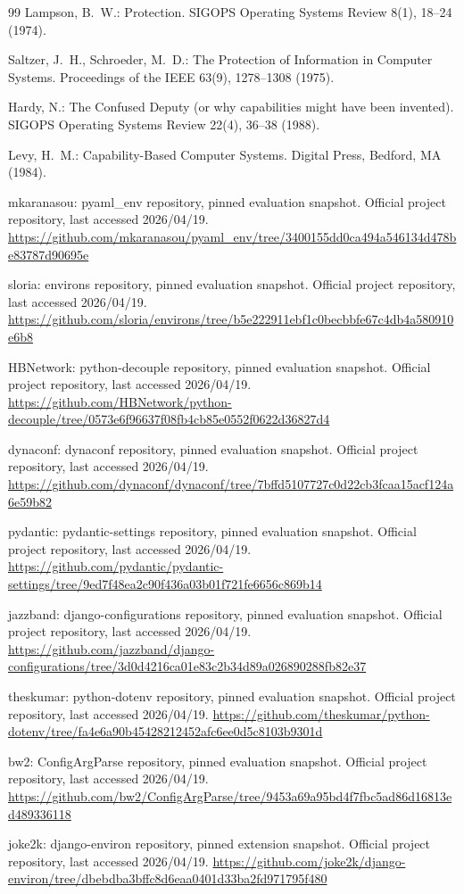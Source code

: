 \documentclass[runningheads]{llncs}
\begin{document}
\begin{thebibliography}{99}
Lampson, B.~W.: Protection. SIGOPS Operating Systems Review 8(1), 18--24 (1974).

Saltzer, J.~H., Schroeder, M.~D.: The Protection of Information in Computer Systems. Proceedings of the IEEE 63(9), 1278--1308 (1975).

Hardy, N.: The Confused Deputy (or why capabilities might have been invented). SIGOPS Operating Systems Review 22(4), 36--38 (1988).

Levy, H.~M.: Capability-Based Computer Systems. Digital Press, Bedford, MA (1984).

mkaranasou: pyaml\_env repository, pinned evaluation snapshot. Official project repository, last accessed 2026/04/19. \url{https://github.com/mkaranasou/pyaml_env/tree/3400155dd0ca494a546134d478be83787d90695e}

sloria: environs repository, pinned evaluation snapshot. Official project repository, last accessed 2026/04/19. \url{https://github.com/sloria/environs/tree/b5e222911ebf1c0becbbfe67c4db4a580910e6b8}

HBNetwork: python-decouple repository, pinned evaluation snapshot. Official project repository, last accessed 2026/04/19. \url{https://github.com/HBNetwork/python-decouple/tree/0573e6f96637f08fb4cb85e0552f0622d36827d4}

dynaconf: dynaconf repository, pinned evaluation snapshot. Official project repository, last accessed 2026/04/19. \url{https://github.com/dynaconf/dynaconf/tree/7bffd5107727c0d22cb3fcaa15acf124a6e59b82}

pydantic: pydantic-settings repository, pinned evaluation snapshot. Official project repository, last accessed 2026/04/19. \url{https://github.com/pydantic/pydantic-settings/tree/9ed7f48ea2c90f436a03b01f721fe6656c869b14}

jazzband: django-configurations repository, pinned evaluation snapshot. Official project repository, last accessed 2026/04/19. \url{https://github.com/jazzband/django-configurations/tree/3d0d4216ca01e83c2b34d89a026890288fb82e37}

theskumar: python-dotenv repository, pinned evaluation snapshot. Official project repository, last accessed 2026/04/19. \url{https://github.com/theskumar/python-dotenv/tree/fa4e6a90b45428212452afc6ee0d5c8103b9301d}

bw2: ConfigArgParse repository, pinned evaluation snapshot. Official project repository, last accessed 2026/04/19. \url{https://github.com/bw2/ConfigArgParse/tree/9453a69a95bd4f7fbc5ad86d16813ed489336118}

joke2k: django-environ repository, pinned extension snapshot. Official project repository, last accessed 2026/04/19. \url{https://github.com/joke2k/django-environ/tree/dbebdba3bffc8d6eaa0401d33ba2fd971795f480}
\end{thebibliography}
\end{document}
